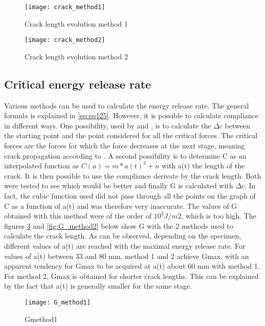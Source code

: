 \begin{figure}[htp]
	\centering
	\texttt{[image: crack\_method1]}
	\caption{Crack length evolution method 1}
	\label{fig:crack_method1}
\end{figure}

\begin{figure}[htp]
	\centering
	\texttt{[image: crack\_method2]}
	\caption{Crack length evolution method 2}
	\label{fig:crack_method2}
\end{figure}

\subsection{Critical energy release rate}

Various methods can be used to calculate the energy release rate. The general formula is explained in \ref{eq:eq125}. However, it is possible to calculate compliance in different ways. One possibility, used by \cite{MALFAIT2021} and \cite{MoutouPitti2008}, is to calculate the $\Delta c$ between the starting point and the point considered for all the critical forces. The critical forces are the forces for which the force decreases at the next stage, meaning crack propagation according to \cite{MoutouPitti2008}. A second possibility is to determine C as an interpolated function as $C(a)=m*a(t)^3+n$ with a(t) the length of the crack.  It is then possible to use the compliance derivate by the crack length. Both were tested to see which would be better and finally G is calculated with $\Delta c$. In fact, the cubic function used did not pass through all the points on the graph of C as a function of a(t) and was therefore very inaccurate. The values of G obtained with this method were of the order of $10^3 J/m2$, which is too high.
The figures \ref{fig:G_method1} and \ref{fig:G_method2} below show G with the 2 methods used to calculate the crack length.
As can be observed, depending on the specimen, different values of a(t) are reached with the maximal energy release rate. For values of a(t) between 33 and 80 mm, method 1 and 2 achieve Gmax, with an apparent tendency for Gmax to be acquired at a(t) about 60 mm with method 1. For method 2, Gmax is obtained for shorter crack lengths. This can be explained by the fact that a(t) is generally smaller for the same stage.

\begin{figure}[htp]
	\centering
	\texttt{[image: G\_method1]}
	\caption{Gmethod1}
	\label{fig:G_method1}
\end{figure}

